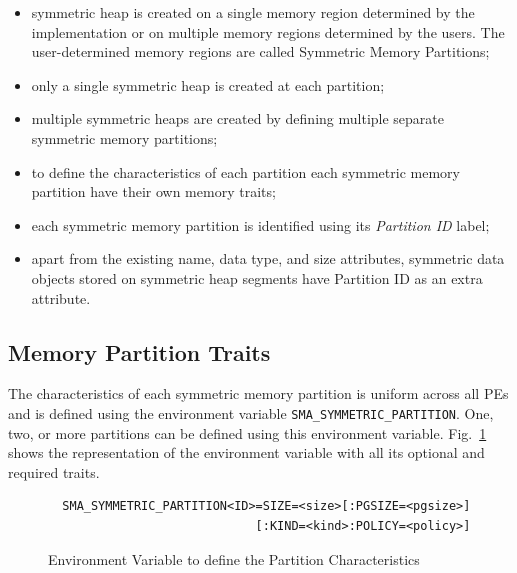 \begin{itemize}
    \item symmetric heap is created on a single memory region
    determined by the implementation or on multiple memory regions
    determined by the users. The user-determined memory regions are
    called Symmetric Memory Partitions;
    \item only a single symmetric heap is created at each partition;
    \item multiple symmetric heaps are created by defining
    multiple separate symmetric memory partitions;
    \item to define the characteristics of each partition each
    symmetric memory partition have their own memory traits;
    \item each symmetric memory partition is identified using its
    \emph{Partition ID} label;
    \item apart from the existing name, data type,
    and size attributes, symmetric
    data objects stored on symmetric heap segments have Partition ID
    as an extra attribute.
\end{itemize}

\subsection{Memory Partition Traits}
\label{src:smempart/traits}
The characteristics of each symmetric memory partition is uniform
across all PEs and is defined using the environment variable
\texttt{SMA\_SYMMETRIC\_PARTITION}. One, two, or more partitions
can be defined using this environment variable. Fig.~\ref{fig:env}
shows the representation of the %
environment variable with all its optional and required traits.

\begin{figure}
    \lstset{language=c,
            keywordstyle=\bfseries,
            basicstyle=\tt\small,
            frame=single}
    \vspace{-20pt}
    \begin{lstlisting}
  SMA_SYMMETRIC_PARTITION<ID>=SIZE=<size>[:PGSIZE=<pgsize>]
                             [:KIND=<kind>:POLICY=<policy>]
    \end{lstlisting}
    \vspace{-10pt}
    \caption{Environment Variable to define the Partition
    Characteristics}
    \vspace{-20pt}
    \label{fig:env}
\end{figure}

